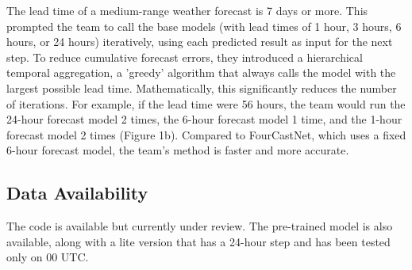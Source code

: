 The lead time of a medium-range weather forecast is 7 days or more. This prompted the team to call the base models (with lead times of 1 hour, 3 hours, 6 hours, or 24 hours) iteratively, using each predicted result as input for the next step. To reduce cumulative forecast errors, they introduced a hierarchical temporal aggregation, a 'greedy' algorithm that always calls the model with the largest possible lead time. Mathematically, this significantly reduces the number of iterations. For example, if the lead time were 56 hours, the team would run the 24-hour forecast model 2 times, the 6-hour forecast model 1 time, and the 1-hour forecast model 2 times (Figure 1b). Compared to FourCastNet, which uses a fixed 6-hour forecast model, the team's method is faster and more accurate.\\

\subsection{Data Availability}

The code is available but currently under review. The pre-trained model is also available, along with a lite version that has a 24-hour step and has been tested only on 00 UTC.\\